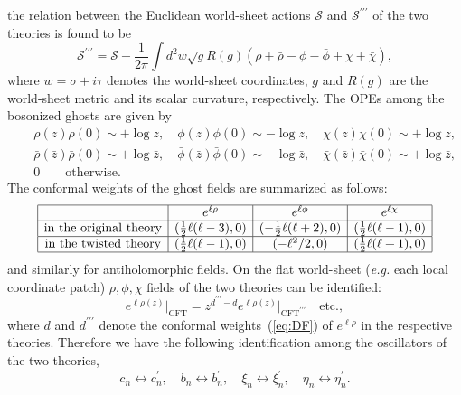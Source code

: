 \documentclass[a4paper,12pt]{article}
\newcommand{\cS}{\mathcal{S}}
\newcommand{\tp}{\prime\prime\prime}
\begin{document}
the relation between the Euclidean world-sheet actions $\cS$ and $\cS^{\tp}$ of the two theories 
is found to be 
\begin{equation}
\cS^{\tp}=\cS-\frac{1}{2\pi}\int d^2w \sqrt{g}R(g)\left(\rho+\bar{\rho}-\phi-\bar{\phi}+\chi+\bar{\chi}\right), 
\label{eq:DD}
\end{equation}
where $w=\sigma+i\tau$ 
denotes the world-sheet coordinates, $g$ and $R(g)$ are the world-sheet metric and its scalar 
curvature, respectively. The OPEs among the bosonized ghosts are 
given by 
\begin{eqnarray}
& &\rho(z)\rho(0)\sim +\log z, \quad \phi(z)\phi(0)\sim -\log z, \quad \chi(z)\chi(0)\sim +\log z, \nonumber \\
& &\bar{\rho}(\bar{z})\bar{\rho}(0)\sim +\log \bar{z}, \quad \bar{\phi}(\bar{z})\bar{\phi}(0)
\sim -\log \bar{z}, \quad \bar{\chi}(\bar{z})\bar{\chi}(0)\sim +\log \bar{z}, \label{eq:DE} \\
& &0\qquad \mathrm{otherwise}.  \nonumber 
\end{eqnarray}
The conformal weights of the ghost fields are summarized as follows:
\begin{equation}
	\begin{array}{|c|c|c|c|}
	\hline
	 & e^{\ell \rho} & e^{\ell\phi} & e^{\ell\chi} \\ \hline 
	\mbox{in the original theory} & (\frac{1}{2}\ell (\ell-3),0) & 
	(-\frac{1}{2}\ell(\ell+2),0) & (\frac{1}{2}\ell(\ell-1),0) \\ \hline
	\mbox{in the twisted theory} & (\frac{1}{2}\ell (\ell-1),0) & 
	(-\ell^2/2,0) & (\frac{1}{2}\ell(\ell+1),0) \\ \hline 
	\end{array} \label{eq:DF}
\end{equation}
and similarly for antiholomorphic fields. 
On the flat world-sheet (\textit{e.g.} each local coordinate patch) 
$\rho,\phi,\chi$ fields of the two theories can be identified:
\[ e^{\ell\rho(z)}\Big|_{\mathrm{CFT}}=z^{d^{\tp}-d}e^{\ell\rho(z)}\Big|_{\mathrm{CFT}^{\tp}}
\quad \mathrm{etc.}, \]
where $d$ and $d^{\tp}$ denote the conformal weights~(\ref{eq:DF}) of $e^{\ell\rho}$ in the 
respective theories. Therefore we have the following identification among the oscillators of the 
two theories, 
\begin{equation}
c_n\leftrightarrow c_n^{\prime},\quad b_n\leftrightarrow b_n^{\prime},\quad \xi_n\leftrightarrow
\xi_n^{\prime},\quad \eta_n\leftrightarrow\eta_n^{\prime}. \label{eq:TH}
\end{equation}
\end{document}
